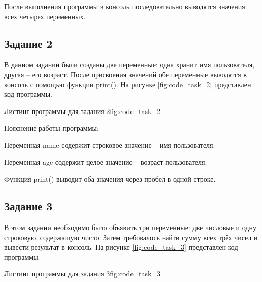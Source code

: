 \documentclass[]{vvsu}
\begin{document}
После выполнения программы в консоль последовательно выводятся значения всех четырех переменных.

\subsection{Задание 2}

В данном задании были созданы две переменные: одна хранит имя пользователя, другая -- его возраст. После присвоения значений обе переменные выводятся в консоль с помощью функции print(). На рисунке \ref{fig:code_task_2} представлен код программы.

\begin{vvsu_figure}{Листинг программы для задания 2}{fig:code_task_2}
  \begin{minipage}{.75\textwidth}
    
  \end{minipage}
\end{vvsu_figure}

Пояснение работы программы:
\begin{vvsu_list}
  \item Переменная name содержит строковое значение -- имя пользователя.
  \item Переменная age содержит целое значение -- возраст пользователя.
  \item Функция print() выводит оба значения через пробел в одной строке.
\end{vvsu_list}


\subsection{Задание 3}

В этом задании необходимо было объявить три переменные: две числовые и одну строковую, содержащую число. Затем требовалось найти сумму всех трёх чисел и вывести результат в консоль. На рисунке \ref{fig:code_task_3} представлен код программы.

\begin{vvsu_figure}{Листинг программы для задания 3}{fig:code_task_3}
  \begin{minipage}{.75\textwidth}
    
  \end{minipage}
\end{vvsu_figure}
\end{document}
